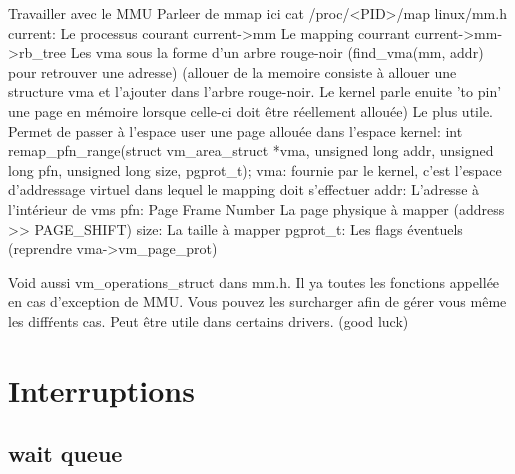 \begin{frame}{Travailler avec le MMU}
Parleer de mmap ici
cat /proc/<PID>/map
linux/mm.h
current: Le processus courant
current->mm Le mapping courrant
current->mm->rb_tree Les vma sous la forme d'un arbre rouge-noir (find_vma(mm, addr) pour retrouver une adresse) (allouer de la memoire consiste à allouer une structure vma et l'ajouter dans l'arbre rouge-noir. Le kernel parle enuite 'to pin' une page en mémoire lorsque celle-ci doit être réellement allouée)
Le plus utile. Permet de passer à l'espace user une page allouée dans l'espace kernel: 
int remap_pfn_range(struct vm_area_struct *vma, unsigned long addr,
                        unsigned long pfn, unsigned long size, pgprot_t);
vma: fournie par le kernel, c'est l'espace d'addressage virtuel dans lequel le mapping doit s'effectuer
addr: L'adresse à l'intérieur de vms
pfn: Page Frame Number La page physique à mapper (address >> PAGE_SHIFT)
size: La taille à mapper
pgprot_t: Les flags éventuels (reprendre vma->vm_page_prot) 

Void aussi vm_operations_struct dans mm.h. Il ya toutes les fonctions appellée en cas d'exception de MMU. Vous pouvez les surcharger afin de gérer vous même les diffŕents cas. Peut être utile dans certains drivers. (good luck)

\end{frame} 

\section{Interruptions}

\subsection{wait queue}

